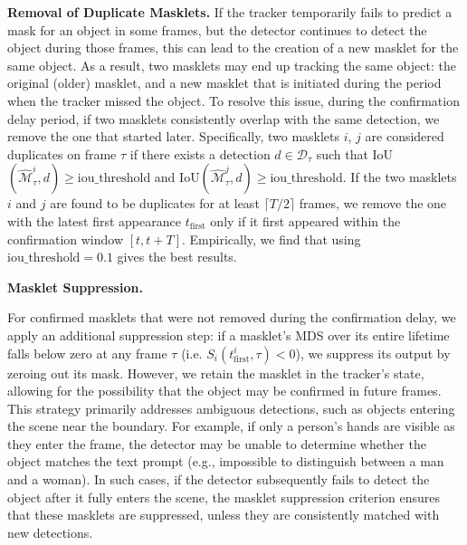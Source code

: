 \documentclass[]{fairmeta}
\newcommand{\eg}{e.g., }
\renewcommand{\paragraph}[1]{%
	\noindent\textbf{#1.}\noindent\xspace%
}
\begin{document}
\paragraph{Removal of Duplicate Masklets} If the tracker temporarily fails to predict a mask for an object in some frames, but the detector continues to detect the object during those frames, this can lead to the creation of a new masklet for the same object. As a result, two masklets may end up tracking the same object: the original (older) masklet, and a new masklet that is initiated during the period when the tracker missed the object. To resolve this issue, during the confirmation delay period, if two masklets consistently overlap with the same detection, we remove the one that started later. Specifically, two masklets $i$, $j$ are considered duplicates on frame $\tau$ if there exists a detection $d \in \mathcal{D}_\tau$ such that IoU$(\mathcal{\hat{M}}_\tau^i, d) \geq \mathrm{iou\_threshold}$ and $\mathrm{IoU}(\mathcal{\hat{M}}_\tau^j, d) \geq \mathrm{iou\_threshold}$. If the two masklets $i$ and $j$ are found to be duplicates for at least $\lceil T/2 \rceil$ frames, we remove the one with the latest first appearance $t_\text{first}$ only if it first appeared within the confirmation window $[t,t+T]$. Empirically, we find that using $\mathrm{iou\_threshold}=0.1$ gives the best results.


\paragraph{Masklet Suppression}
For confirmed masklets that were not removed during the confirmation delay, we apply an additional suppression step: if a masklet’s MDS over its entire lifetime falls below zero at any frame $\tau$ (i.e. $S_i(t_\text{first}^i, \tau) < 0$), we suppress its output by zeroing out its mask. However, we retain the masklet in the tracker’s state, allowing for the possibility that the object may be confirmed in future frames. This strategy primarily addresses ambiguous detections, such as objects entering the scene near the boundary. For example, if only a person’s hands are visible as they enter the frame, the detector may be unable to determine whether the object matches the text prompt (\eg impossible to distinguish between a man and a woman). In such cases, if the detector subsequently fails to detect the object after it fully enters the scene, the masklet suppression criterion ensures that these masklets are suppressed, unless they are consistently matched with new detections.
\end{document}
